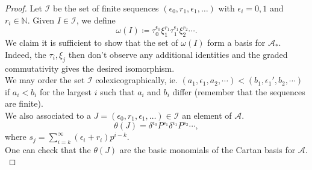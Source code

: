 \documentclass[11pt, a4paper]{article}
\theoremstyle{plain}
\newtheorem*{proof}{Proof}
\begin{document}
\begin{proof}
	Let $\mathcal{I}$ be the set of finite sequences $( \epsilon_0, r_1,\epsilon_1,\ldots) $ with $\epsilon_i = 0,1$ and $r_i \in \mathbb{N}$. 
	Given $I \in \mathcal{I}$, we define
	\[ 
	\omega( I) \coloneqq \tau_0^{\epsilon_0}\xi_1^{r_1}\tau_1^{\epsilon_1}\xi_2^{r_2}\cdots.
	\]
We claim it is sufficient to show that the set of $\omega( I) $ form a basis for $\mathcal{A}_\ast$. Indeed, the $\tau_i, \xi_j$ then don't observe any additional identities and the graded commutativity gives the desired isomorphism.\\
We may order the set $\mathcal{I}$ colexicographically, ie. $( a_1, \epsilon_1,a_2,\cdots) < ( b_1, \epsilon_1', b_2, \cdots) $ if $a_i<b_i$ for the largest $i$ such that $a_i$ and $b_i$ differ (remember that the sequences are finite).\\

We also associated to a $J = ( \epsilon_0, r_1, \epsilon_1,\ldots)  \in \mathcal{I} $ an element of $\mathcal{A}$.
\[ 
\theta( J) = \delta^{\epsilon_0}P^{s_1}\delta^{\epsilon_1}P^{s_2}\cdots,
\]
where $s_j= \sum_{i=k}^{ \infty }( \epsilon_i+ r_i) p^{i-k}$.\\

One can check that the $\theta( J) $ are the basic monomials of the Cartan basis for $\mathcal{A}$.\\


\end{proof}
\end{document}
